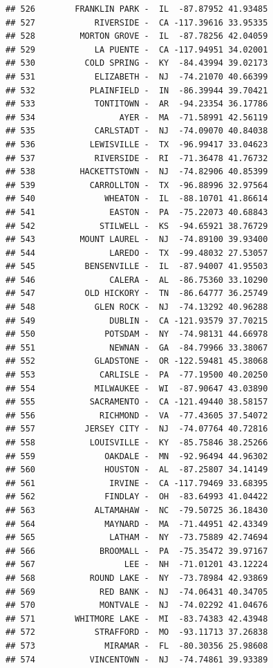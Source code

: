 \documentclass{article}\usepackage[]{graphicx}\usepackage[]{color}
\makeatletter
\newenvironment{kframe}{%
 \def\at@end@of@kframe{}%
 \ifinner\ifhmode%
  \def\at@end@of@kframe{\end{minipage}}%
  \begin{minipage}{\columnwidth}%
 \fi\fi%
 \def\FrameCommand##1{\hskip\@totalleftmargin \hskip-\fboxsep
 \colorbox{shadecolor}{##1}\hskip-\fboxsep
     \hskip-\linewidth \hskip-\@totalleftmargin \hskip\columnwidth}%
 \MakeFramed {\advance\hsize-\width
   \@totalleftmargin\z@ \linewidth\hsize
   \@setminipage}}%
 {\par\unskip\endMakeFramed%
 \at@end@of@kframe}
\newenvironment{knitrout}{}{} %
\makeatother
\begin{document}
\begin{knitrout}
\begin{kframe}
\begin{verbatim}
## 526        FRANKLIN PARK -  IL  -87.87952 41.93485
## 527            RIVERSIDE -  CA -117.39616 33.95335
## 528         MORTON GROVE -  IL  -87.78256 42.04059
## 529            LA PUENTE -  CA -117.94951 34.02001
## 530          COLD SPRING -  KY  -84.43994 39.02173
## 531            ELIZABETH -  NJ  -74.21070 40.66399
## 532           PLAINFIELD -  IN  -86.39944 39.70421
## 533            TONTITOWN -  AR  -94.23354 36.17786
## 534                 AYER -  MA  -71.58991 42.56119
## 535            CARLSTADT -  NJ  -74.09070 40.84038
## 536           LEWISVILLE -  TX  -96.99417 33.04623
## 537            RIVERSIDE -  RI  -71.36478 41.76732
## 538         HACKETTSTOWN -  NJ  -74.82906 40.85399
## 539           CARROLLTON -  TX  -96.88996 32.97564
## 540              WHEATON -  IL  -88.10701 41.86614
## 541               EASTON -  PA  -75.22073 40.68843
## 542             STILWELL -  KS  -94.65921 38.76729
## 543         MOUNT LAUREL -  NJ  -74.89100 39.93400
## 544               LAREDO -  TX  -99.48032 27.53057
## 545          BENSENVILLE -  IL  -87.94007 41.95503
## 546               CALERA -  AL  -86.75360 33.10290
## 547          OLD HICKORY -  TN  -86.64777 36.25749
## 548            GLEN ROCK -  NJ  -74.13292 40.96288
## 549               DUBLIN -  CA -121.93579 37.70215
## 550              POTSDAM -  NY  -74.98131 44.66978
## 551               NEWNAN -  GA  -84.79966 33.38067
## 552            GLADSTONE -  OR -122.59481 45.38068
## 553             CARLISLE -  PA  -77.19500 40.20250
## 554            MILWAUKEE -  WI  -87.90647 43.03890
## 555           SACRAMENTO -  CA -121.49440 38.58157
## 556             RICHMOND -  VA  -77.43605 37.54072
## 557          JERSEY CITY -  NJ  -74.07764 40.72816
## 558           LOUISVILLE -  KY  -85.75846 38.25266
## 559              OAKDALE -  MN  -92.96494 44.96302
## 560              HOUSTON -  AL  -87.25807 34.14149
## 561               IRVINE -  CA -117.79469 33.68395
## 562              FINDLAY -  OH  -83.64993 41.04422
## 563            ALTAMAHAW -  NC  -79.50725 36.18430
## 564              MAYNARD -  MA  -71.44951 42.43349
## 565               LATHAM -  NY  -73.75889 42.74694
## 566             BROOMALL -  PA  -75.35472 39.97167
## 567                  LEE -  NH  -71.01201 43.12224
## 568           ROUND LAKE -  NY  -73.78984 42.93869
## 569             RED BANK -  NJ  -74.06431 40.34705
## 570             MONTVALE -  NJ  -74.02292 41.04676
## 571        WHITMORE LAKE -  MI  -83.74383 42.43948
## 572            STRAFFORD -  MO  -93.11713 37.26838
## 573              MIRAMAR -  FL  -80.30356 25.98608
## 574           VINCENTOWN -  NJ  -74.74861 39.93389

\end{verbatim}
\end{kframe}
\end{knitrout}
\end{document}
